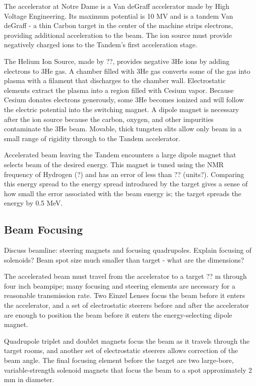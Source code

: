 The accelerator at Notre Dame is a Van deGraff accelerator made by High Voltage Engineering.  Its maximum potential is 10 MV and is a tandem Van deGraff - a thin Carbon target in the center of the machine strips electrons, providing additional acceleration to the beam.  The ion source must provide negatively charged ions to the Tandem's first acceleration stage.

The Helium Ion Source, made by ??, provides negative 3He ions by adding electrons to 3He gas.  A chamber filled with 3He gas converts some of the gas into plasma with a filament that discharges to the chamber wall.  Electrostatic elements extract the plasma into a region filled with Cesium vapor.  Because Cesium donates electrons generously, some 3He becomes ionized and will follow the electric potential into the switching magnet.  A dipole magnet is necessary after the ion source because the carbon, oxygen, and other impurities contaminate the 3He beam.  Movable, thick tungsten slits allow only beam in a small range of rigidity through to the Tandem accelerator.

Accelerated beam leaving the Tandem encounters a large dipole magnet that selects beam of the desired energy.  This magnet is tuned using the NMR frequency of Hydrogen (?) and has an error of less than ?? (units?).  Comparing this energy spread to the energy spread introduced by the target gives a sense of how small the error associated with the beam energy is; the target spreads the energy by 0.5 MeV.

\subsection{Beam Focusing}
Discuss beamline: steering magnets and focusing quadrupoles.
Explain focusing of solenoids?
Beam spot size much smaller than target - what are the dimensions?

The accelerated beam must travel from the accelerator to a target ?? m through four inch beampipe; many focusing and steering elements are necessary for a reasonable transmission rate.  Two Einzel Lenses focus the beam before it enters the accelerator, and a set of electrostatic steerers before and after the accelerator are enough to position the beam before it enters the energy-selecting dipole magnet.

Quadrupole triplet and doublet magnets focus the beam as it travels through the target rooms, and another set of electrostatic steerers allows correction of the beam angle.  The final focusing element before the target are two large-bore, variable-strength solenoid magnets that focus the beam to a spot approximately 2 mm in diameter.

